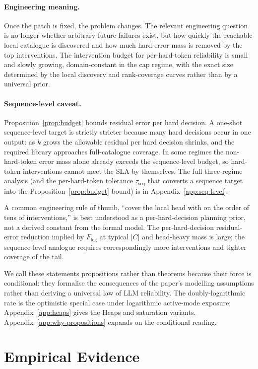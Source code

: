 \documentclass{article}
\theoremstyle{taeplain}
\theoremstyle{taedefn}
\begin{document}
\paragraph{Engineering meaning.}
Once the patch is fixed, the problem changes. The relevant engineering question is no longer whether arbitrary future failures exist, but how quickly the reachable local catalogue is discovered and how much hard-error mass is removed by the top interventions. The intervention budget for per-hard-token reliability is small and slowly growing, domain-constant in the cap regime, with the exact size determined by the local discovery and rank-coverage curves rather than by a universal prior.

\paragraph{Sequence-level caveat.}
Proposition~\ref{prop:budget} bounds residual error per hard decision. A one-shot sequence-level target is strictly stricter because many hard decisions occur in one output: as $k$ grows the allowable residual per hard decision shrinks, and the required library approaches full-catalogue coverage. In some regimes the non-hard-token error mass alone already exceeds the sequence-level budget, so hard-token interventions cannot meet the SLA by themselves. The full three-regime analysis (and the per-hard-token tolerance $\tau_{\text{seq}}$ that converts a sequence target into the Proposition~\ref{prop:budget} bound) is in Appendix~\ref{app:seq-level}.

A common engineering rule of thumb, ``cover the local head with on the order of tens of interventions,'' is best understood as a per-hard-decision planning prior, not a derived constant from the formal model. The per-hard-decision residual-error reduction implied by $F_{\log}$ at typical $|C|$ and head-heavy mass is large; the sequence-level analogue requires correspondingly more interventions and tighter coverage of the tail.

We call these statements propositions rather than theorems because their force is conditional: they formalise the consequences of the paper's modelling assumptions rather than deriving a universal law of LLM reliability. The doubly-logarithmic rate is the optimistic special case under logarithmic active-mode exposure; Appendix~\ref{app:heaps} gives the Heaps and saturation variants. Appendix~\ref{app:why-propositions} expands on the conditional reading.

\section{Empirical Evidence}
\label{sec:evidence}
\end{document}
